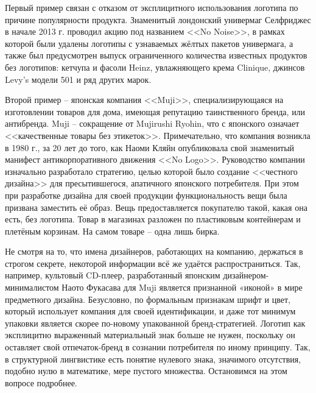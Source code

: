 Первый пример связан с отказом от эксплицитного использования логотипа по причине популярности
продукта. Знаменитый лондонский универмаг Селфриджес в начале 2013 г. проводил акцию под названием
<<No Noise>>, в рамках которой были удалены логотипы с узнаваемых жёлтых пакетов универмага, а также
был предусмотрен выпуск ограниченного количества известных продуктов без логотипов: кетчупа и фасоли
Heinz, увлажняющего крема Clinique, джинсов Levy's модели 501 и ряд других марок.

Второй пример -- японская компания <<Muji>>, специализирующаяся на изготовлении товаров для дома,
имеющая репутацию таинственного бренда, или антибренда. Muji -- сокращение от Mujirushi
Ryohin, что с японского означает <<качественные товары без этикеток>>. Примечательно, что
компания возникла в 1980 г., за 20 лет до того, как Наоми Кляйн опубликовала свой знаменитый
манифест антикорпоративного движения <<No Logo>>. Руководство компании изначально разработало
стратегию, целью которой было создание <<честного дизайна>> для пресытившегося, апатичного японского
потребителя. При этом при разработке дизайна для своей продукции функциональность вещи была призвана
заместить её образ. Вещь предоставляется покупателю такой, какая она есть, без логотипа. Товар в
магазинах разложен по пластиковым контейнерам и плетёным корзинам. На самом товаре -- одна лишь
бирка.

Не смотря на то, что имена дизайнеров, работающих на компанию, держаться в строгом секрете, некоторой информации всё же удаётся распространиться. Так, например, культовый CD-плеер, разработанный японским дизайнером-минималистом Наото Фукасава для Muji является признанной «иконой» в мире предметного дизайна. Безусловно, по формальным признакам шрифт и цвет, который использует компания для своей идентификации, и даже тот минимум упаковки является скорее  по-новому упакованной бренд-стратегией.  Логотип как эксплицитно выраженный материальный знак больше не нужен, поскольку он  оставляет свой отпечаток-бренд в сознании потребителя по иному принципу. Так, в структурной лингвистике есть понятие нулевого знака, значимого отсутствия, подобно нулю в математике, мере пустого множества. Остановимся на этом вопросе подробнее.

